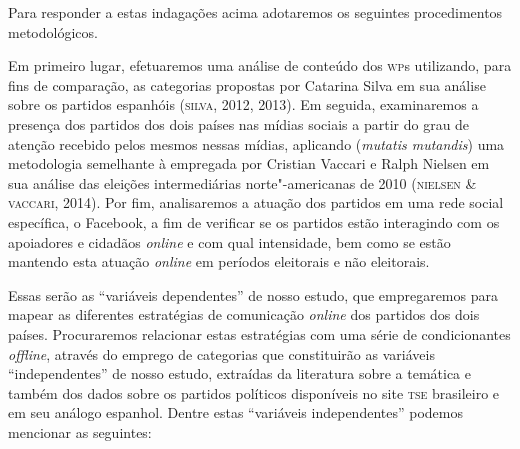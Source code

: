 Para responder a estas indagações acima adotaremos os seguintes
procedimentos metodológicos.

Em primeiro lugar, efetuaremos uma análise de conteúdo dos \textsc{wp}s
utilizando, para fins de comparação, as categorias propostas por
Catarina Silva em sua análise sobre os partidos espanhóis (\textsc{silva}, 2012,
2013). Em seguida, examinaremos a presença dos partidos dos dois países
nas mídias sociais a partir do grau de atenção recebido pelos
mesmos nessas mídias, aplicando (\textit{mutatis mutandis}) uma
metodologia semelhante à empregada por Cristian Vaccari e Ralph Nielsen
em sua análise das eleições intermediárias norte"-americanas de 2010
(\textsc{nielsen \& vaccari}, 2014). Por fim, analisaremos a atuação dos partidos
em uma rede social específica, o Facebook, a fim de verificar se os
partidos estão interagindo com os apoiadores e cidadãos \textit{online} e com
qual intensidade, bem como se estão mantendo esta atuação \textit{online} em
períodos eleitorais e não eleitorais.

Essas serão as ``variáveis dependentes'' de nosso estudo, que
empregaremos para mapear as diferentes estratégias de comunicação
\textit{online} dos partidos dos dois países. Procuraremos relacionar estas
estratégias com uma série de condicionantes \textit{offline}, através do
emprego de categorias que constituirão as variáveis ``independentes'' de
nosso estudo, extraídas da literatura sobre a temática e também dos
dados sobre os partidos políticos disponíveis no site \textsc{tse} brasileiro e
em seu análogo espanhol. Dentre estas ``variáveis independentes''
podemos mencionar as seguintes:

